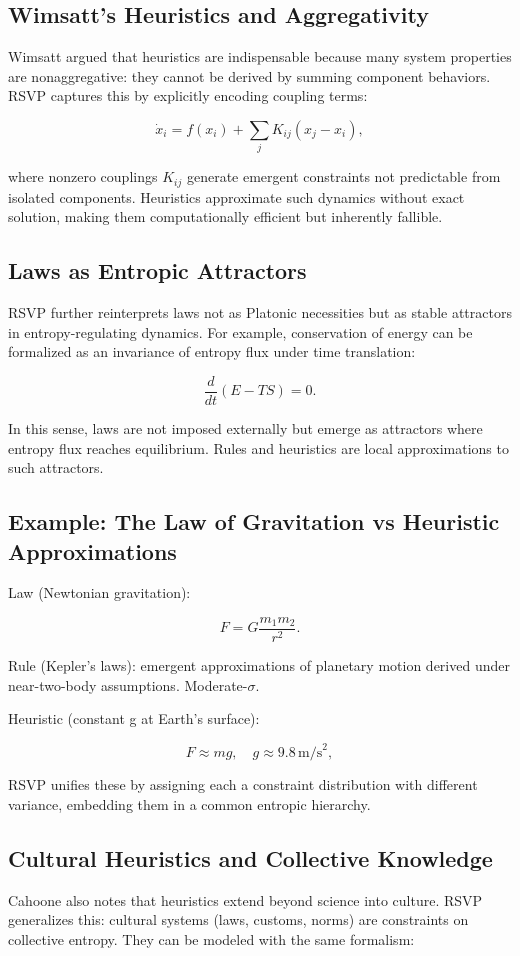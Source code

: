 \documentclass[12pt]{book}
\begin{document}
\subsection{Wimsatt’s Heuristics and Aggregativity}
Wimsatt argued that heuristics are indispensable because many system properties are nonaggregative: they cannot be derived by summing component behaviors. RSVP captures this by explicitly encoding coupling terms:

\[ \dot{x}_i = f(x_i) + \sum_{j} K_{ij}(x_j - x_i), \]

where nonzero couplings \( K_{ij} \) generate emergent constraints not predictable from isolated components. Heuristics approximate such dynamics without exact solution, making them computationally efficient but inherently fallible.

\subsection{Laws as Entropic Attractors}
RSVP further reinterprets laws not as Platonic necessities but as stable attractors in entropy-regulating dynamics. For example, conservation of energy can be formalized as an invariance of entropy flux under time translation:

\[ \frac{d}{dt}\left(E - TS\right) = 0. \]

In this sense, laws are not imposed externally but emerge as attractors where entropy flux reaches equilibrium. Rules and heuristics are local approximations to such attractors.

\subsection{Example: The Law of Gravitation vs Heuristic Approximations}
Law (Newtonian gravitation):

\[ F = G \frac{m_1 m_2}{r^2}. \]

Rule (Kepler’s laws): emergent approximations of planetary motion derived under near-two-body assumptions. Moderate-\( \sigma \).

Heuristic (constant g at Earth’s surface):

\[ F \approx mg, \quad g \approx 9.8 \, \text{m/s}^2, \]

RSVP unifies these by assigning each a constraint distribution with different variance, embedding them in a common entropic hierarchy.

\subsection{Cultural Heuristics and Collective Knowledge}
Cahoone also notes that heuristics extend beyond science into culture. RSVP generalizes this: cultural systems (laws, customs, norms) are constraints on collective entropy. They can be modeled with the same formalism:
\end{document}

